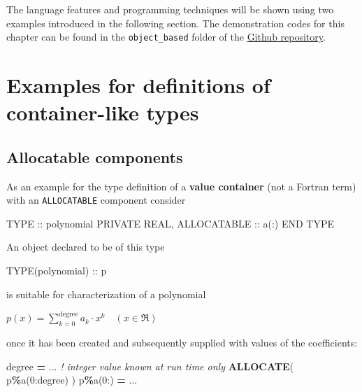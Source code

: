 \documentclass[
  paper=a4,
  ,captions=tableheading
]{scrartcl}
\newenvironment{Shaded}{\begin{snugshade}}{\end{snugshade}}
\newcommand{\CommentTok}[1]{\textcolor[rgb]{0.56,0.35,0.01}{\textit{#1}}}
\newcommand{\DataTypeTok}[1]{\textcolor[rgb]{0.13,0.29,0.53}{#1}}
\newcommand{\DecValTok}[1]{\textcolor[rgb]{0.00,0.00,0.81}{#1}}
\newcommand{\KeywordTok}[1]{\textcolor[rgb]{0.13,0.29,0.53}{\textbf{#1}}}
\newcommand{\NormalTok}[1]{#1}
\newcommand{\OperatorTok}[1]{\textcolor[rgb]{0.81,0.36,0.00}{\textbf{#1}}}
\begin{document}
The language features and programming techniques will be shown using two
examples introduced in the following section. The demonstration codes
for this chapter can be found in the \texttt{object\_based} folder of
the \href{https://github.com/reinh-bader/object_fortran}{Github
repository}.

\section{Examples for definitions of container-like
types}\label{examples-for-definitions-of-container-like-types}

\subsection{Allocatable components}\label{allocatable-components}

As an example for the type definition of a \textbf{value container} (not
a Fortran term) with an \texttt{ALLOCATABLE} component consider

\begin{Shaded}
\begin{Highlighting}[]
\DataTypeTok{TYPE} \DataTypeTok{::}\NormalTok{ polynomial}
   \DataTypeTok{PRIVATE}
   \DataTypeTok{REAL}\NormalTok{, }\DataTypeTok{ALLOCATABLE} \DataTypeTok{::}\NormalTok{ a(:)}
\DataTypeTok{END TYPE}
\end{Highlighting}
\end{Shaded}

An object declared to be of this type

\begin{Shaded}
\begin{Highlighting}[]
\DataTypeTok{TYPE(polynomial)} \DataTypeTok{::}\NormalTok{ p}
\end{Highlighting}
\end{Shaded}

is suitable for characterization of a polynomial

\(p(x) = \sum_{k=0}^{\text{degree}} a_{k} \cdot x^k \quad (x \in \Re)\)

once it has been created and subsequently supplied with values of the
coefficients:

\begin{Shaded}
\begin{Highlighting}[]
\NormalTok{degree }\KeywordTok{=}\NormalTok{ ... }\CommentTok{! integer value known at run time only}
\KeywordTok{ALLOCATE}\NormalTok{( p}\OperatorTok{\%}\NormalTok{a(}\DecValTok{0}\NormalTok{:degree) )}
\NormalTok{p}\OperatorTok{\%}\NormalTok{a(}\DecValTok{0}\NormalTok{:) }\KeywordTok{=}\NormalTok{ ...}
\end{Highlighting}
\end{Shaded}
\end{document}
